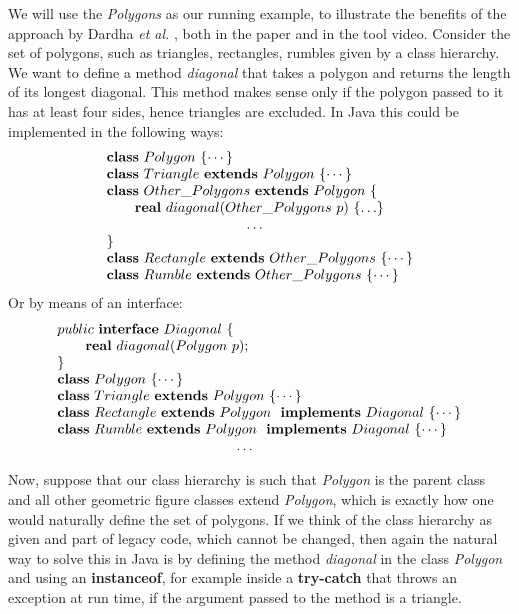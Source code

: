 \documentclass[runningheads]{llncs}
\begin{document}
\begin{example}
We will use the \emph{Polygons} as our running example, to illustrate the benefits of the approach by Dardha \emph{et al.} \cite{Dardha2013,Dardha2017}, both in the paper and in the tool video.
Consider the set of polygons, such as triangles, rectangles, rumbles given by a class hierarchy.
We want to define a method \emph{diagonal} that takes a polygon and returns the length of its longest diagonal. This method makes sense only if the polygon passed to it has at least four sides, hence triangles are excluded.
In Java this could be implemented in the following ways:
$$
\begin{array}{l}
\synclass Polygon \ \{ \cdots\}
\\
\syndecl{Triangle}{Polygon} {\cdots}
\\
\syndecl{Other\_Polygons}{Polygon} {
\\
	\qquad \mathbf{real}\ diagonal(Other\_Polygons \ p)\ \{\ldots \}
	\\
	\hspace{3.5cm} \ldots
	\\
}
\\
\syndecl{Rectangle}{Other\_Polygons}{\cdots}
\\
\syndecl{Rumble}{Other\_Polygons} {\cdots}
\end{array}
$$
Or by means of an interface:
$$
\begin{array}{l}
public \ \syninterface Diagonal\ \{
	\\
	\qquad \mathbf{real}\ diagonal(Polygon \ p);
	\\
\}
\\
\synclass Polygon \ \{\cdots\}
\\
\syndecl{Triangle}{Polygon} {\cdots}
\\
\synidecl{Rectangle}{Polygon} \synimpl Diagonal \ \{\cdots\}
\\
\synidecl{Rumble}{Polygon} \synimpl Diagonal \ \{\cdots\}
\\
\hspace{4.5cm} \ldots
\end{array}
$$

Now, suppose that our class hierarchy is such that \emph{Polygon} is the parent class and all other geometric figure classes extend \emph{Polygon}, which is exactly how one would naturally define the set of polygons. If we think of the class hierarchy as given and part of legacy code, which cannot be changed, then again the natural way to solve this in Java is by defining the method \emph{diagonal} in the class \emph{Polygon} and using an \textbf{instanceof}, for example inside a \textbf{try-catch} that throws an exception at run time, if the argument passed to the method is a triangle.


\end{example}
\end{document}
